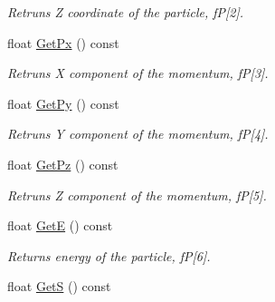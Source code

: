 \begin{DoxyCompactItemize}
\begin{DoxyCompactList}\small\item\em Retruns Z coordinate of the particle, fP\mbox{[}2\mbox{]}. \end{DoxyCompactList}\item 
float \hyperlink{classKFParticleBase_a797c4fd327ec66f1af12d947dc62fa2e}{Get\+Px} () const \hypertarget{classKFParticleBase_a797c4fd327ec66f1af12d947dc62fa2e}{}\label{classKFParticleBase_a797c4fd327ec66f1af12d947dc62fa2e}

\begin{DoxyCompactList}\small\item\em Retruns X component of the momentum, fP\mbox{[}3\mbox{]}. \end{DoxyCompactList}\item 
float \hyperlink{classKFParticleBase_aa93b12eff0960f12c0e7741129439cae}{Get\+Py} () const \hypertarget{classKFParticleBase_aa93b12eff0960f12c0e7741129439cae}{}\label{classKFParticleBase_aa93b12eff0960f12c0e7741129439cae}

\begin{DoxyCompactList}\small\item\em Retruns Y component of the momentum, fP\mbox{[}4\mbox{]}. \end{DoxyCompactList}\item 
float \hyperlink{classKFParticleBase_ae80c9269acc433d4d3fbf9041d7c3a5e}{Get\+Pz} () const \hypertarget{classKFParticleBase_ae80c9269acc433d4d3fbf9041d7c3a5e}{}\label{classKFParticleBase_ae80c9269acc433d4d3fbf9041d7c3a5e}

\begin{DoxyCompactList}\small\item\em Retruns Z component of the momentum, fP\mbox{[}5\mbox{]}. \end{DoxyCompactList}\item 
float \hyperlink{classKFParticleBase_aef14e8b7a54d4b2ed041d7d0dde5d4c4}{GetE} () const \hypertarget{classKFParticleBase_aef14e8b7a54d4b2ed041d7d0dde5d4c4}{}\label{classKFParticleBase_aef14e8b7a54d4b2ed041d7d0dde5d4c4}

\begin{DoxyCompactList}\small\item\em Returns energy of the particle, fP\mbox{[}6\mbox{]}. \end{DoxyCompactList}\item 
float \hyperlink{classKFParticleBase_a0bbf5922ff06f290eeb21065016a0353}{GetS} () const \hypertarget{classKFParticleBase_a0bbf5922ff06f290eeb21065016a0353}{}\label{classKFParticleBase_a0bbf5922ff06f290eeb21065016a0353}


\end{DoxyCompactItemize}

